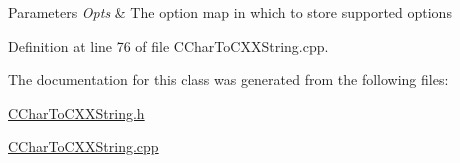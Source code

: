 \begin{DoxyParams}{Parameters}
{\em Opts} & The option map in which to store supported options \\
\hline
\end{DoxyParams}


Definition at line 76 of file C\+Char\+To\+C\+X\+X\+String.\+cpp.



The documentation for this class was generated from the following files\+:\begin{DoxyCompactItemize}
\item 
\hyperlink{_c_char_to_c_x_x_string_8h}{C\+Char\+To\+C\+X\+X\+String.\+h}\item 
\hyperlink{_c_char_to_c_x_x_string_8cpp}{C\+Char\+To\+C\+X\+X\+String.\+cpp}\end{DoxyCompactItemize}
